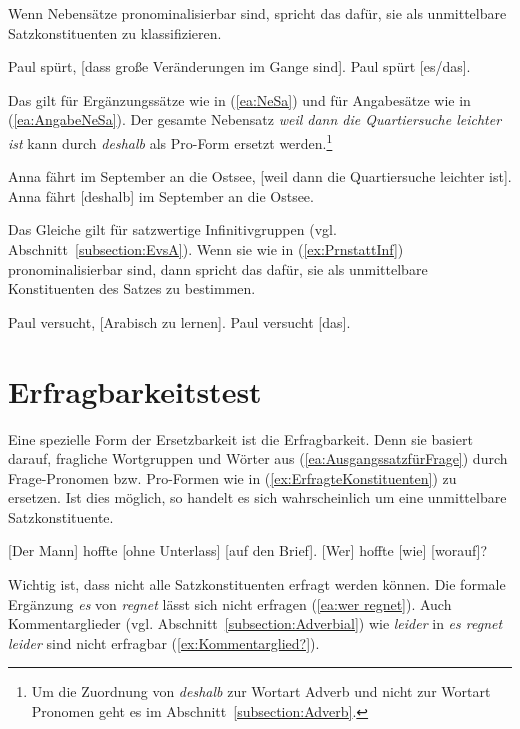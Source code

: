 Wenn Nebensätze pronominalisierbar sind, spricht das dafür, sie als unmittelbare Satzkonstituenten zu klassifizieren.

\ea \label{ea:PrnvonNeSa}
\ea \label{ea:NeSa} Paul spürt, [dass große Veränderungen im Gange sind].
\ex \label{ex:PrnstattNeSa} Paul spürt [es/das].
\z
\z 

Das gilt für Ergänzungssätze wie in (\ref{ea:NeSa}) und für Angabesätze wie in (\ref{ea:AngabeNeSa}). Der gesamte Nebensatz \textit{weil dann die Quartiersuche leichter ist} kann durch \textit{deshalb} als Pro-Form ersetzt werden.\footnote{Um die Zuordnung von \textit{deshalb} zur Wortart Adverb und nicht zur Wortart Pronomen geht es im Abschnitt~\ref{subsection:Adverb}.}  

\ea \label{ea:AngabesatzTest}
\ea \label{ea:AngabeNeSa} Anna fährt im September an die Ostsee, [weil dann die Quartiersuche leichter ist].
\ex \label{ex:deshalb} Anna fährt [deshalb] im September an die Ostsee.
\z 
\z 

Das Gleiche gilt für satzwertige Infinitivgruppen (vgl. Abschnitt~\ref{subsection:EvsA}). Wenn sie wie in (\ref{ex:PrnstattInf}) pronominalisierbar sind, dann spricht das dafür, sie als unmittelbare Konstituenten des Satzes zu bestimmen.

\ea \label{ea:PrnvonInf}
\ea \label{ea:Inf} Paul versucht, [Arabisch zu lernen].
\ex \label{ex:PrnstattInf} Paul versucht [das].
\z 
\z 


\section{Erfragbarkeitstest}\label{section:Erfragbarkeit}

Eine spezielle Form der Ersetzbarkeit ist die Erfragbarkeit. Denn sie basiert darauf, fragliche Wortgruppen und Wörter aus (\ref{ea:AusgangssatzfürFrage}) durch Frage-Pronomen bzw. Pro-Formen wie in (\ref{ex:ErfragteKonstituenten}) zu ersetzen. Ist dies möglich, so handelt es sich wahrscheinlich um eine unmittelbare Satzkonstituente.

\ea \label{ea:Erfragbarkeitstest}
\ea \label{ea:AusgangssatzfürFrage} [Der Mann] hoffte [ohne Unterlass] [auf den Brief].
\ex \label{ex:ErfragteKonstituenten}[Wer] hoffte [wie] [worauf]?
\z 
\z 


Wichtig ist, dass nicht alle Satzkonstituenten erfragt werden können. Die formale Ergänzung \textit{es} von \textit{regnet} lässt sich nicht erfragen (\ref{ea:wer regnet}). Auch Kommentarglieder (vgl. Abschnitt~\ref{subsection:Adverbial}) wie \textit{leider} in \textit{es regnet leider} sind nicht erfragbar (\ref{ex:Kommentarglied?}).

